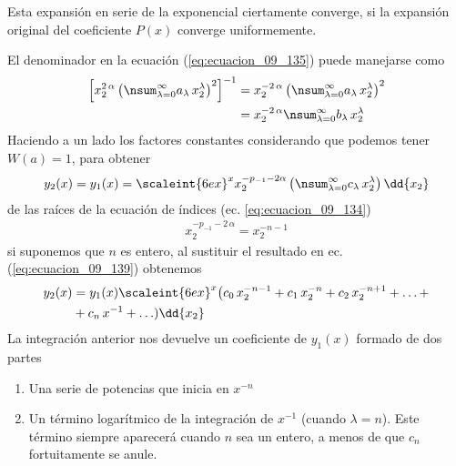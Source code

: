 Esta expansión en serie de la exponencial ciertamente converge, si la expansión original del coeficiente $P (x)$ converge uniformemente.
\par
El denominador en la ecuación (\ref{eq:ecuacion_09_135}) puede manejarse como
\begin{align}
\begin{aligned}[b]
\left[ x_{2}^{2 \, \alpha} \left( \nsum_{\lambda=0}^{\infty} a_{\lambda} \, x_{2}^{\lambda} \right)^{2} \right]^{-1} &= x_{2}^{-2 \, \alpha} \left( \nsum_{\lambda=0}^{\infty} a_{\lambda} \, x_{2}^{\lambda} \right)^{2}  \\
&= x_{2}^{-2 \, \alpha} \nsum_{\lambda=0}^{\infty} b_{\lambda} \, x_{2}^{\lambda}
\end{aligned}
\label{eq:ecuacion_09_138}
\end{align}
Haciendo a un lado los factores constantes considerando que podemos tener $W (a) = 1$, para obtener
\begin{align}
y_{2} (x) =  y_{1}(x) = \scaleint{6ex}^{x} x_{2}^{-p_{-1} - 2 \alpha} \left( \nsum_{\lambda=0}^{\infty} c_{\lambda} \, x_{2}^{\lambda} \right) \dd{x_{2}} 
\label{eq:ecuacion_09_139}
\end{align}
de las raíces de la ecuación de índices (ec. \ref{eq:ecuacion_09_134})
\begin{align}
x_{2}^{-p_{-1} - 2 \, \alpha} = x_{2}^{-n-1}
\end{align}
si suponemos que $n$ es entero, al sustituir el resultado en ec. (\ref{eq:ecuacion_09_139}) obtenemos 
\begin{align}
\begin{aligned}[b]
y_{2} (x) &= y_{1} (x) \scaleint{6ex}^{x} \big( c_{0} \, x_{2}^{-n-1} + c_{1} \, x_{2}^{-n} + c_{2} \, x_{2}^{-n+1} + \ldots + \\
&+ c_{n} \, x^{-1} + \ldots ) \dd{x_{2}}
\end{aligned}
\label{eq:ecuacion_09_141}
\end{align}
La integración anterior nos devuelve un coeficiente de $y_{1} (x)$ formado de dos partes
\begin{enumerate}
\item Una serie de potencias que inicia en $x^{-n}$
\item Un término logarítmico de la integración de $x^{-1}$ (cuando $\lambda = n$). Este término siempre aparecerá cuando $n$ sea un entero, a menos de que $c_{n}$ fortuitamente se anule.
\end{enumerate}

